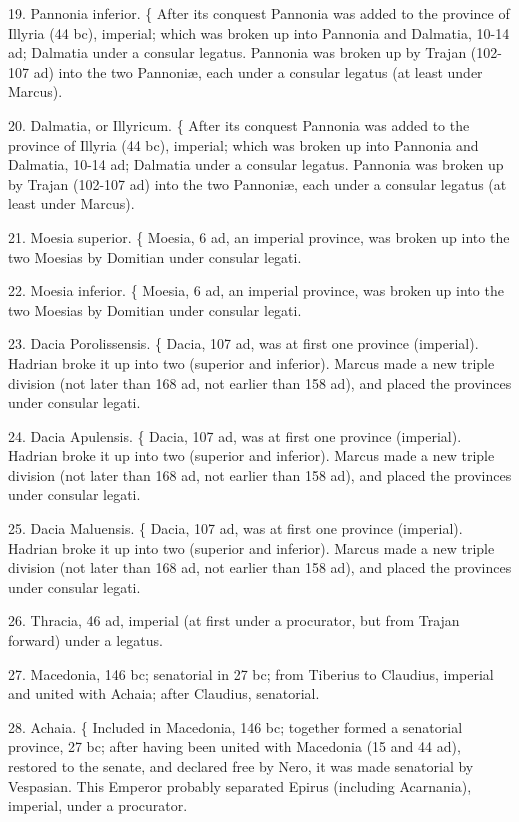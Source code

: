 19. Pannonia inferior. \{ After its conquest Pannonia was added to the province of Illyria (44 bc), imperial; which was broken up into Pannonia and Dalmatia, 10-14 ad; Dalmatia under a consular legatus. Pannonia was broken up by Trajan (102-107 ad) into the two Pannoniæ, each under a consular legatus (at least under Marcus).

20. Dalmatia, or Illyricum. \{ After its conquest Pannonia was added to the province of Illyria (44 bc), imperial; which was broken up into Pannonia and Dalmatia, 10-14 ad; Dalmatia under a consular legatus. Pannonia was broken up by Trajan (102-107 ad) into the two Pannoniæ, each under a consular legatus (at least under Marcus).

21. Moesia superior. \{ Moesia, 6 ad, an imperial province, was broken up into the two Moesias by Domitian under consular legati.

22. Moesia inferior. \{ Moesia, 6 ad, an imperial province, was broken up into the two Moesias by Domitian under consular legati.

23. Dacia Porolissensis. \{ Dacia, 107 ad, was at first one province (imperial). Hadrian broke it up into two (superior and inferior). Marcus made a new triple division (not later than 168 ad, not earlier than 158 ad), and placed the provinces under consular legati.

24. Dacia Apulensis. \{ Dacia, 107 ad, was at first one province (imperial). Hadrian broke it up into two (superior and inferior). Marcus made a new triple division (not later than 168 ad, not earlier than 158 ad), and placed the provinces under consular legati.

25. Dacia Maluensis. \{ Dacia, 107 ad, was at first one province (imperial). Hadrian broke it up into two (superior and inferior). Marcus made a new triple division (not later than 168 ad, not earlier than 158 ad), and placed the provinces under consular legati.

26. Thracia, 46 ad, imperial (at first under a procurator, but from Trajan forward) under a legatus.

27. Macedonia, 146 bc; senatorial in 27 bc; from Tiberius to Claudius, imperial and united with Achaia; after Claudius, senatorial.

28. Achaia. \{ Included in Macedonia, 146 bc; together formed a senatorial province, 27 bc; after having been united with Macedonia (15 and 44 ad), restored to the senate, and declared free by Nero, it was made senatorial by Vespasian. This Emperor probably separated Epirus (including Acarnania), imperial, under a procurator.


